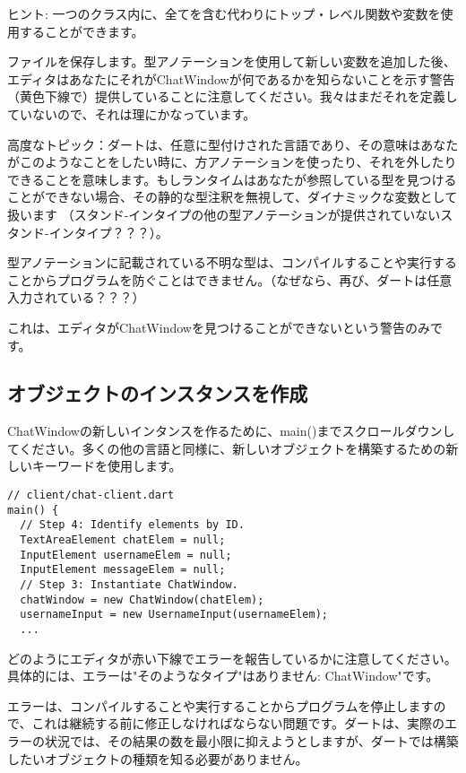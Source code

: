 ヒント: 一つのクラス内に、全てを含む代わりにトップ・レベル関数や変数を使用することができます。

ファイルを保存します。型アノテーションを使用して新しい変数を追加した後、エディタはあなたにそれがChatWindowが何であるかを知らないことを示す警告（黄色下線で）提供していることに注意してください。我々はまだそれを定義していないので、それは理にかなっています。


高度なトピック：ダートは、任意に型付けされた言語であり、その意味はあなたがこのようなことをしたい時に、方アノテーションを使ったり、それを外したりできることを意味します。もしランタイムはあなたが参照している型を見つけることができない場合、その静的な型注釈を無視して、ダイナミックな変数として扱います
（スタンド-インタイプの他の型アノテーションが提供されていないスタンド-インタイプ？？？）。

型アノテーションに記載されている不明な型は、コンパイルすることや実行することからプログラムを防ぐことはできません。（なぜなら、再び、ダートは任意入力されている？？？）

これは、エディタがChatWindowを見つけることができないという警告のみです。

\subsection{オブジェクトのインスタンスを作成}

ChatWindowの新しいインタンスを作るために、main()までスクロールダウンしてください。多くの他の言語と同様に、新しいオブジェクトを構築するための新しいキーワードを使用します。

\begin{verbatim}
// client/chat-client.dart
main() {
  // Step 4: Identify elements by ID.
  TextAreaElement chatElem = null;
  InputElement usernameElem = null;
  InputElement messageElem = null;
  // Step 3: Instantiate ChatWindow.
  chatWindow = new ChatWindow(chatElem);
  usernameInput = new UsernameInput(usernameElem);
  ...
\end{verbatim}

どのようにエディタが赤い下線でエラーを報告しているかに注意してください。具体的には、エラーは"そのようなタイプ"はありません: ChatWindow"です。


エラーは、コンパイルすることや実行することからプログラムを停止しますので、これは継続する前に修正しなければならない問題です。ダートは、実際のエラーの状況では、その結果の数を最小限に抑えようとしますが、ダートでは構築したいオブジェクトの種類を知る必要がありません。

